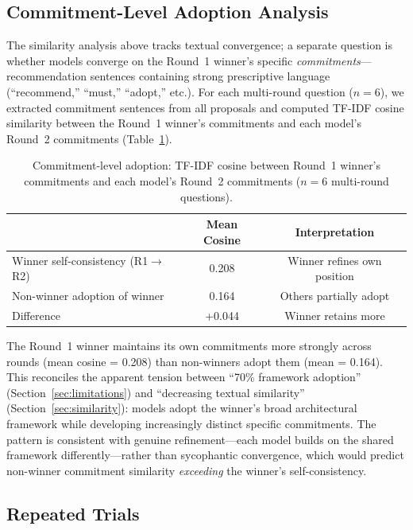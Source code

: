 \documentclass[11pt,a4paper]{article}
\begin{document}
\subsection{Commitment-Level Adoption Analysis}
\label{sec:commitment}

The similarity analysis above tracks textual convergence; a separate question is whether models converge on the Round~1 winner's specific \emph{commitments}---recommendation sentences containing strong prescriptive language (``recommend,'' ``must,'' ``adopt,'' etc.). For each multi-round question ($n = 6$), we extracted commitment sentences from all proposals and computed TF-IDF cosine similarity between the Round~1 winner's commitments and each model's Round~2 commitments (Table~\ref{tab:commitment}).

\begin{table}[ht]
\centering
\caption{Commitment-level adoption: TF-IDF cosine between Round~1 winner's commitments and each model's Round~2 commitments ($n = 6$ multi-round questions).}
\label{tab:commitment}
\begin{tabular}{@{}lcc@{}}
\toprule
 & \textbf{Mean Cosine} & \textbf{Interpretation} \\
\midrule
Winner self-consistency (R1$\to$R2) & 0.208 & Winner refines own position \\
Non-winner adoption of winner & 0.164 & Others partially adopt \\
\midrule
Difference & +0.044 & Winner retains more \\
\bottomrule
\end{tabular}
\end{table}

The Round~1 winner maintains its own commitments more strongly across rounds (mean cosine = 0.208) than non-winners adopt them (mean = 0.164). This reconciles the apparent tension between ``70\% framework adoption'' (Section~\ref{sec:limitations}) and ``decreasing textual similarity'' (Section~\ref{sec:similarity}): models adopt the winner's broad architectural framework while developing increasingly distinct specific commitments. The pattern is consistent with genuine refinement---each model builds on the shared framework differently---rather than sycophantic convergence, which would predict non-winner commitment similarity \emph{exceeding} the winner's self-consistency.

\subsection{Repeated Trials}
\label{sec:repeated_trials}
\end{document}
